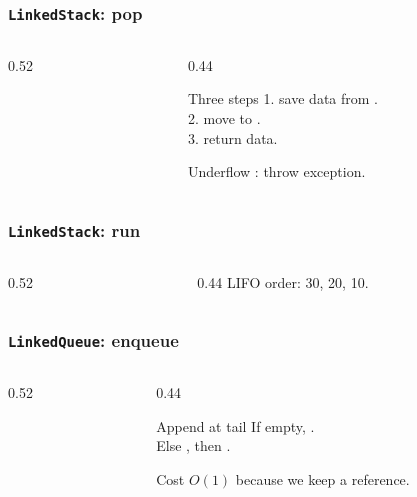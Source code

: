 \documentclass[aspectratio=169,10pt,compress]{beamer}
\begin{document}
\begin{frame}[t,fragile]\frametitle{\texttt{LinkedStack}: pop}
  \begin{columns}[T]
    \begin{column}{0.52\textwidth}
    \end{column}
    \begin{column}{0.44\textwidth}
      \begin{block}{Three steps}
        \small
        1. save data from .\\
        2. move  to .\\
        3. return data.
      \end{block}
      \begin{block}{Underflow}
        \small
        : throw exception.
      \end{block}
    \end{column}
  \end{columns}
\end{frame}

\begin{frame}[t,fragile]\frametitle{\texttt{LinkedStack}: run}
  \begin{columns}[T]
    \begin{column}{0.52\textwidth}
    \end{column}
    \begin{column}{0.44\textwidth}
      \small
      LIFO order: 30, 20, 10.
    \end{column}
  \end{columns}
\end{frame}

\begin{frame}[t,fragile]\frametitle{\texttt{LinkedQueue}: enqueue}
  \begin{columns}[T]
    \begin{column}{0.52\textwidth}
    \end{column}
    \begin{column}{0.44\textwidth}
      \begin{block}{Append at tail}
        \small
        If empty, .\\
        Else , then .
      \end{block}
      \begin{block}{Cost}
        \small
        $O(1)$ because we keep a  reference.
      \end{block}
    \end{column}
  \end{columns}
\end{frame}
\end{document}
